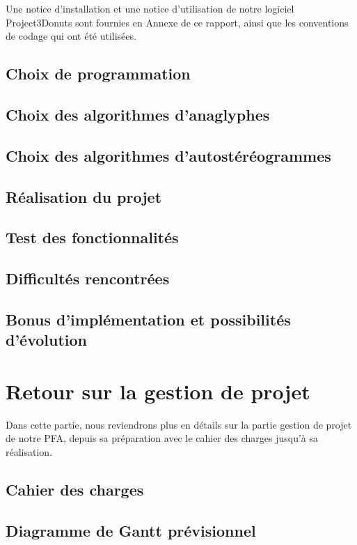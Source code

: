 \documentclass[paper=a4, fontsize=12pt]{article}
\newenvironment{changemargin}[2]{\begin{list}{}{%
      \setlength{\topsep}{0pt}%
      \setlength{\leftmargin}{0pt}%
      \setlength{\rightmargin}{0pt}%
      \setlength{\listparindent}{\parindent}%
      \setlength{\itemindent}{\parindent}%
      \setlength{\parsep}{0pt plus 1pt}%
      \addtolength{\leftmargin}{#1}%
      \addtolength{\rightmargin}{#2}%
    }\item }{\end{list}}
\numberwithin{equation}{section}		%
\numberwithin{figure}{section}			%
\numberwithin{table}{section}				%
\begin{document}
\begin{changemargin}{-1cm}{-1cm}
  Une notice d'installation et une notice d'utilisation de notre logiciel Project3Donuts sont fournies en Annexe de ce rapport, ainsi que les conventions de codage qui ont été utilisées.

  \subsection{Choix de programmation}
  
  \subsection{Choix des algorithmes d'anaglyphes}
  
  \subsection{Choix des algorithmes d'autostéréogrammes}
  
  \subsection{Réalisation du projet}
  
  \subsection{Test des fonctionnalités}
  
  \subsection{Difficultés rencontrées}
  
  \subsection{Bonus d'implémentation et possibilités d'évolution}
  
  
  \newpage

  \section{Retour sur la gestion de projet}
  Dans cette partie, nous reviendrons plus en détails sur la partie gestion de projet de notre PFA, depuis sa préparation avec le cahier des charges jusqu'à sa réalisation.
  \subsection{Cahier des charges}
  
  \subsection{Diagramme de Gantt prévisionnel}
  

\end{changemargin}
\end{document}
